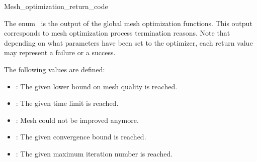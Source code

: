\ccRefPageBegin


\begin{ccRefEnum}{Mesh_optimization_return_code}  %


\ccDefinition
  
The enum \ccRefName\ is the output of the global mesh optimization
functions. This output corresponds to mesh optimization process termination reasons.
Note that depending on what parameters have been set to the optimizer, each
return value may represent a failure or a success.






The following values are defined:
\begin{itemize}
\item {}: The given lower bound on mesh quality is
  reached.
\item {}: The given time limit is reached.
\item {}: Mesh could not be improved anymore.
\item {}: The given convergence bound is reached.
\item {}: The given maximum iteration number is reached.
\end{itemize}



\ccSeeAlso
{} \\
 \\
 \\
 \\


\end{ccRefEnum}

\ccRefPageEnd

